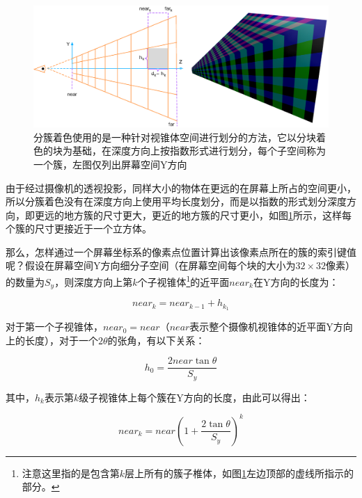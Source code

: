 \begin{figure}
\begin{fullwidth}
	\includegraphics[width=\thewidth]{figures/shade/clusters}
	\caption{分簇着色使用的是一种针对视锥体空间进行划分的方法，它以分块着色的块为基础，在深度方向上按指数形式进行划分，每个子空间称为一个簇，左图仅列出屏幕空间Y方向}
	\label{f:shade-clusters}
\end{fullwidth}
\end{figure}

由于经过摄像机的透视投影，同样大小的物体在更远的在屏幕上所占的空间更小，所以分簇着色没有在深度方向上使用平均长度划分，而是以指数的形式划分深度方向，即更远的地方簇的尺寸更大，更近的地方簇的尺寸更小，如图\ref{f:shade-clusters}所示，这样每个簇的尺寸更接近于一个立方体。

那么，怎样通过一个屏幕坐标系的像素点位置计算出该像素点所在的簇的索引键值呢？假设在屏幕空间Y方向细分子空间（在屏幕空间每个块的大小为$32\times 32$像素）的数量为$S_y$，则深度方向上第$k$个子视锥体\footnote{注意这里指的是包含第$k$层上所有的簇子椎体，如图\ref{f:shade-clusters}左边顶部的虚线所指示的部分。}的近平面$near_k$在Y方向的长度为：

\begin{equation}
	near_k=near_{k-1}+h_{k_1}
\end{equation}

\noindent 对于第一个子视锥体，$near_0=near$（$near$表示整个摄像机视锥体的近平面Y方向上的长度），对于一个$2\theta$的张角，有以下关系：

\begin{equation}
	h_0=\frac{2near\tan{\theta}}{S_y}
\end{equation}

\noindent 其中，$h_k$表示第$k$级子视锥体上每个簇在Y方向的长度，由此可以得出：

\begin{equation}
	near_k=near(1+\frac{2\tan{\theta}}{S_y})^k
\end{equation}

